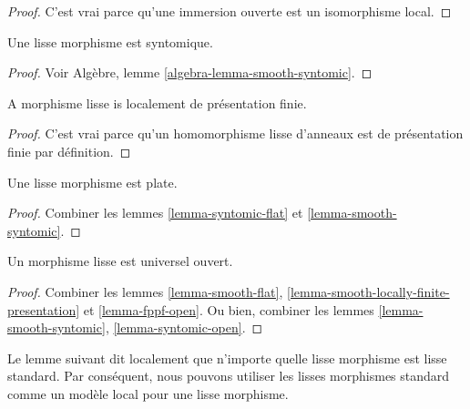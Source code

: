 \begin{proof}

C'est vrai parce qu'une immersion ouverte est un isomorphisme local.

\end{proof}

\begin{lemma}

\label{lemma-smooth-syntomic}
Une lisse morphisme est syntomique.
\end{lemma}

\begin{proof}
Voir Algèbre, lemme \ref{algebra-lemma-smooth-syntomic}.
\end{proof}

\begin{lemma}

\label{lemma-smooth-locally-finite-presentation}

A morphisme lisse is localement de présentation finie.

\end{lemma}

\begin{proof}

C'est vrai parce qu'un homomorphisme lisse d'anneaux est de présentation finie par définition.

\end{proof}

\begin{lemma}

\label{lemma-smooth-flat}
Une lisse morphisme est plate.
\end{lemma}

\begin{proof}
Combiner les lemmes \ref{lemma-syntomic-flat} et \ref{lemma-smooth-syntomic}.
\end{proof}

\begin{lemma}

\label{lemma-smooth-open}
Un morphisme lisse est universel ouvert.
\end{lemma}

\begin{proof}
Combiner les lemmes \ref{lemma-smooth-flat}, \ref{lemma-smooth-locally-finite-presentation} et \ref{lemma-fppf-open}. Ou bien, combiner les lemmes \ref{lemma-smooth-syntomic}, \ref{lemma-syntomic-open}.
\end{proof}

\noindent
Le lemme suivant dit localement que n'importe quelle lisse morphisme est lisse standard. Par conséquent, nous pouvons utiliser les lisses morphismes standard comme un modèle local {\it} pour une lisse morphisme.

